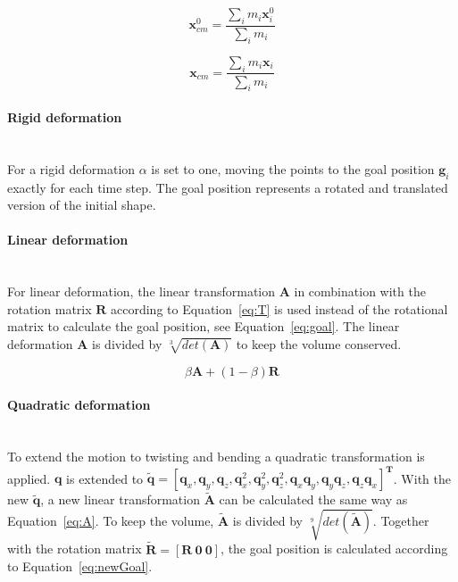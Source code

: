     \begin{equation} \label{eq:com1}
        \mathbf{x}^0_{cm} = \frac{\sum_i{m_i\mathbf{x}_i^0}}{\sum_i{m_i}}
    \end{equation}

    \begin{equation} \label{eq:com2}
        \mathbf{x}_{cm} = \frac{\sum_i{m_i\mathbf{x}_i}}{\sum_i{m_i}}
    \end{equation}

    \paragraph{Rigid deformation}\mbox{}\\[5px]
    For a rigid deformation $\alpha$ is set to one, moving the points to the goal position $\mathbf{g}_i$ exactly for each time step.
    The goal position represents a rotated and translated version of the initial shape.

    \paragraph{Linear deformation}\mbox{}\\[5px]
    For linear deformation, the linear transformation $\mathbf{A}$ in combination with the rotation matrix $\mathbf{R}$ according to Equation~\ref{eq:T} is used instead of the rotational matrix to calculate the goal position, see Equation~\ref{eq:goal}.
    The linear deformation $\mathbf{A}$ is divided by $\sqrt[3]{det(\mathbf{A})}$ to keep the volume conserved.

    \begin{equation} \label{eq:T}
        \beta\mathbf{A} + (1 - \beta)\mathbf{R}
    \end{equation}

    \paragraph{Quadratic deformation}\mbox{}\\[5px]
    To extend the motion to twisting and bending a quadratic transformation is applied.
    $\mathbf{q}$ is extended to $\mathbf{\tilde{q}} = [\mathbf{q}_x, \mathbf{q}_y, \mathbf{q}_z, \mathbf{q}_x^2, \mathbf{q}_y^2, \mathbf{q}_z^2, \mathbf{q}_x\mathbf{q}_y, \mathbf{q}_y\mathbf{q}_z, \mathbf{q}_z\mathbf{q}_x]^\mathbf{T}$.
    With the new $\mathbf{\tilde{q}}$, a new linear transformation $\mathbf{\tilde{A}}$ can be calculated the same way as Equation~\ref{eq:A}.
    To keep the volume, $\mathbf{\tilde{A}}$ is divided by $\sqrt[9]{det(\mathbf{\tilde{A}})}$.
    Together with the rotation matrix $\mathbf{\tilde{R}} = [\mathbf{R~0~0}]$, the goal position is calculated according to Equation~\ref{eq:newGoal}.

